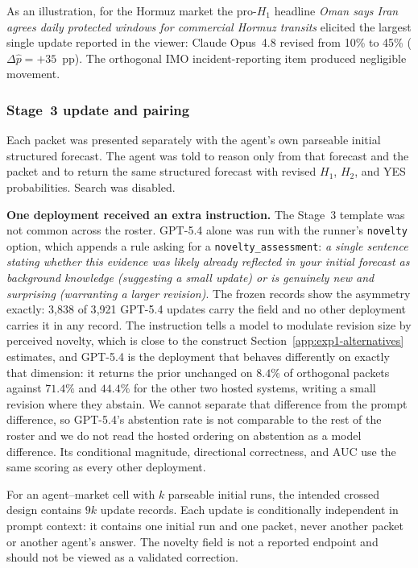 As an illustration, for the Hormuz market the pro-$H_1$ headline
\textit{Oman says Iran agrees daily protected windows for commercial Hormuz transits}
elicited the largest single update reported in the viewer: Claude Opus~4.8 revised
from 10\% to 45\% (\(\Delta\hat p=+35\)~pp).  The orthogonal IMO
incident-reporting item produced negligible movement.

\subsubsection{Stage~3 update and pairing}
\label{app:update-protocol}

Each packet was presented separately with the agent's own parseable initial structured
forecast.  The agent was told to reason only from that forecast and the packet and to
return the same structured forecast with revised $H_1$, $H_2$, and YES probabilities.
Search was disabled.

\noindent\textbf{One deployment received an extra instruction.}
The Stage~3 template was not common across the roster.  GPT-5.4 alone was run with the
runner's \texttt{novelty} option, which appends a rule asking for a
\texttt{novelty\_assessment}: \emph{a single sentence stating whether this evidence was
likely already reflected in your initial forecast as background knowledge (suggesting a
small update) or is genuinely new and surprising (warranting a larger revision)}.
The frozen records show the asymmetry exactly: 3{,}838 of 3{,}921 GPT-5.4 updates carry
the field and no other deployment carries it in any record.  The instruction tells a
model to modulate revision size by perceived novelty, which is close to the construct
Section~\ref{app:exp1-alternatives} estimates, and GPT-5.4 is the deployment that
behaves differently on exactly that dimension: it returns the prior unchanged on
$8.4\%$ of orthogonal packets against $71.4\%$ and $44.4\%$ for the other two hosted
systems, writing a small revision where they abstain.  We cannot separate that
difference from the prompt difference, so GPT-5.4's abstention rate is not comparable to
the rest of the roster and we do not read the hosted ordering on abstention as a model
difference.  Its conditional magnitude, directional correctness, and AUC use the same
scoring as every other deployment.

For an agent--market cell with \(k\) parseable initial runs, the intended crossed design
contains \(9k\) update records.  Each update is conditionally independent in prompt
context: it contains one initial run and one packet, never another packet or another
agent's answer.  The novelty field is not a reported endpoint and should not be
viewed as a validated correction.

